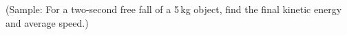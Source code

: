 \documentclass[11pt,pdfa,lastpage,minititle]{MishoNote}
\begin{document}
\vspace{3em}

\noindent
(Sample: For a two-second free fall of a 5\,kg object, find the final kinetic energy and average speed.)
\begin{center}
\end{center}

\end{document}
